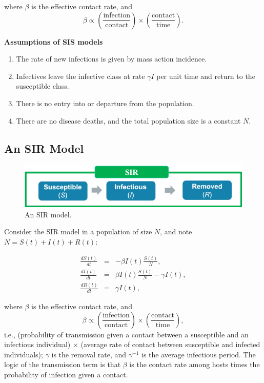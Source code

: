 \documentclass[]{book}
\providecommand{\tightlist}{%
  \setlength{\itemsep}{0pt}\setlength{\parskip}{0pt}}
\begin{document}
where \(\beta\) is the effective contact rate, and \[
\beta \propto \left(\frac{\mathrm{infection}}{\mathrm{contact}} \right) \times \left(\frac{\mathrm{contact}}{\mathrm{time}}\right). 
\]

\textbf{Assumptions of SIS models}

\begin{enumerate}
\def\labelenumi{(\roman{enumi})}
\tightlist
\item
  The rate of new infections is given by mass action incidence.
\item
  Infectives leave the infective class at rate \(\gamma I\) per unit
  time and return to the susceptible class.
\item
  There is no entry into or departure from the population.
\item
  There are no disease deaths, and the total population size is a
  constant \(N\).
\end{enumerate}

\subsection{An SIR Model}\label{an-sir-model}

\begin{figure}

{\centering \includegraphics[width=0.75\linewidth]{figures/SIR} 

}

\caption{An SIR model.}\label{fig:SIR}
\end{figure}

Consider the SIR model in a population of size \(N\), and note
\(N = S(t) + I(t) + R(t)\):

\begin{eqnarray*}
\frac{dS(t)}{dt}& = & - \beta I(t)\frac{S(t)}{N}, \\
\frac{dI(t)}{dt}& = &\beta I(t)\frac{S(t)}{N} - \gamma I(t), \\
\frac{dR(t)}{dt}& = &\gamma I(t), 
\end{eqnarray*}

where \(\beta\) is the effective contact rate, and \[
  \beta \propto \left(\frac{\mathrm{infection}}{\mathrm{contact}} \right) \times \left(\frac{\mathrm{contact}}{\mathrm{time}}\right),  
\] i.e., (probability of transmission given a contact between a
susceptible and an infectious individual) \(\times\) (average rate of
contact between susceptible and infected individuals); \(\gamma\) is the
removal rate, and \(\gamma^{-1}\) is the average infectious period. The
logic of the transmission term is that \(\beta\) is the contact rate
among hosts times the probability of infection given a contact.
\end{document}
